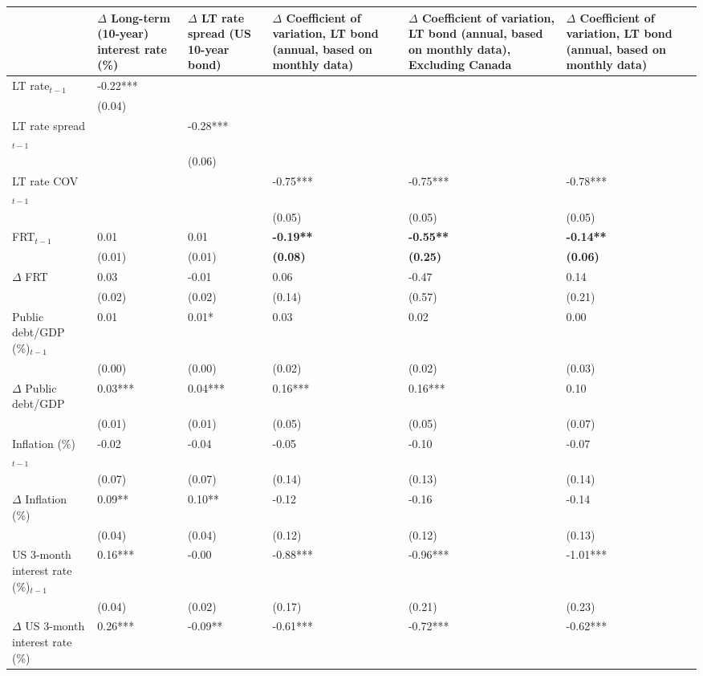 {\tiny
\begin{tabular}{lp{2cm}p{2cm}p{2cm}p{2cm}p{2cm}}
  \hline
 & $\Delta$ Long-term (10-year) interest rate (\%) & $\Delta$ LT rate spread (US 10-year bond) & $\Delta$ Coefficient of variation, LT bond (annual, based on monthly data) & $\Delta$ Coefficient of variation, LT bond (annual, based on monthly data), \textbf{Excluding Canada} & $\Delta$ Coefficient of variation, LT bond (annual, based on monthly data) \\ 
  \hline
LT rate$_{t-1}$ & -0.22*** &  &  &  &  \\ 
   & (0.04) &  &  &  &  \\ 
  LT rate spread$_{t-1}$ &  & -0.28*** &  &  &  \\ 
   &  & (0.06) &  &  &  \\ 
  LT rate COV$_{t-1}$ &  &  & -0.75*** & -0.75*** & -0.78*** \\ 
   &  &  & (0.05) & (0.05) & (0.05) \\ 
  FRT$_{t-1}$ & 0.01 & 0.01 & \textbf{-0.19**} & \textbf{-0.55**} & \textbf{-0.14**} \\ 
   & (0.01) & (0.01) & \textbf{(0.08)} & \textbf{(0.25)} & \textbf{(0.06)} \\ 
  $\Delta$ FRT & 0.03 & -0.01 & 0.06 & -0.47 & 0.14 \\ 
   & (0.02) & (0.02) & (0.14) & (0.57) & (0.21) \\ 
  Public debt/GDP (\%)$_{t-1}$ & 0.01 & 0.01* & 0.03 & 0.02 & 0.00 \\ 
   & (0.00) & (0.00) & (0.02) & (0.02) & (0.03) \\ 
  $\Delta$ Public debt/GDP & 0.03*** & 0.04*** & 0.16*** & 0.16*** & 0.10 \\ 
   & (0.01) & (0.01) & (0.05) & (0.05) & (0.07) \\ 
  Inflation (\%) $_{t-1}$ & -0.02 & -0.04 & -0.05 & -0.10 & -0.07 \\ 
   & (0.07) & (0.07) & (0.14) & (0.13) & (0.14) \\ 
  $\Delta$ Inflation (\%) & 0.09** & 0.10** & -0.12 & -0.16 & -0.14 \\ 
   & (0.04) & (0.04) & (0.12) & (0.12) & (0.13) \\ 
  US 3-month interest rate (\%)$_{t-1}$ & 0.16*** & -0.00 & -0.88*** & -0.96*** & -1.01*** \\ 
   & (0.04) & (0.02) & (0.17) & (0.21) & (0.23) \\ 
  $\Delta$ US 3-month interest rate (\%) & 0.26*** & -0.09** & -0.61*** & -0.72*** & -0.62*** \\ 

\end{tabular}}
